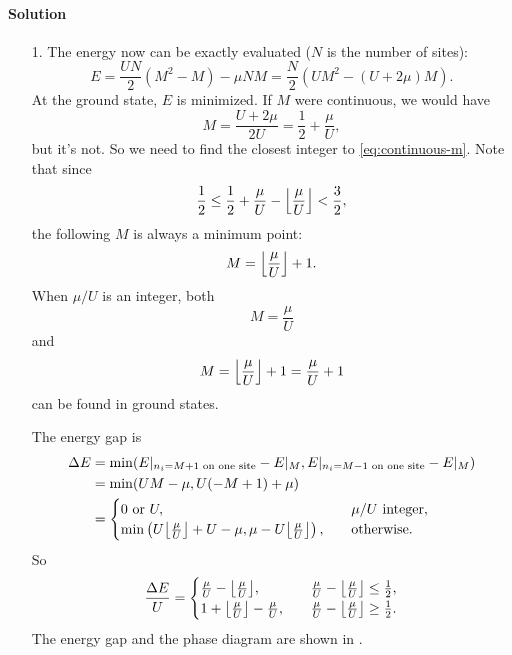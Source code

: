 \documentclass[hyperref, a4paper]{article}
\DeclarePairedDelimiter\floor{\lfloor}{\rfloor}
\begin{document}
\paragraph{Solution} \begin{itemize}
\item[1.] The energy now can be exactly evaluated ($N$ is the number of sites):
\begin{equation}
    E = \frac{U N}{2} (M^2 - M) - \mu NM
    = \frac{N}{2} (U M^2 - (U + 2\mu) M).
\end{equation}
At the ground state, $E$ is minimized.
If $M$ were continuous, we would have
\begin{equation}
    M = \frac{U + 2\mu}{2 U} = \frac{1}{2} + \frac{\mu}{U}, 
    \label{eq:continuous-m}
\end{equation}
but it's not. So we need to find the closest integer to \eqref{eq:continuous-m}.
Note that since
\[
    \frac{1}{2} \leq \frac{1}{2} + \frac{\mu}{U} - \floor*{\frac{\mu}{U}} < \frac{3}{2},
\]
the following $M$ is always a minimum point:
\begin{equation}
    M = \floor*{\frac{\mu}{U}} + 1.
\end{equation}
When $\mu / U$ is an integer, both 
\begin{equation}
    M = \frac{\mu}{U} 
\end{equation}
and 
\begin{equation}
    M = \floor*{\frac{\mu}{U}} + 1 = \frac{\mu}{U} + 1
\end{equation}
can be found in ground states.

The energy gap is 
\begin{equation}
    \begin{aligned}
        \Delta E &= \min( E|_{n_i = M+1 \text{ on one site}} - E|_M, E|_{n_i = M-1 \text{ on one site}} - E|_M ) \\
        &= \min( UM - \mu, U(- M + 1) + \mu ) \\
        &= \begin{cases}
            0 \text{ or } U, \quad &\text{$\mu / U$ integer}, \\
            \min\left( 
                U \floor*{\frac{\mu}{U}} + U - \mu,
                \mu - U \floor*{\frac{\mu}{U}} \right),\quad &\text{otherwise}.
        \end{cases}
    \end{aligned}
\end{equation}
So
\begin{equation}
    \frac{\Delta E}{U} 
    = \begin{cases}
        \frac{\mu}{U} - \floor*{\frac{\mu}{U}} , &\quad \frac{\mu}{U} - \floor*{\frac{\mu}{U}} \leq \frac{1}{2} , \\
        1 + \floor*{\frac{\mu}{U}} - \frac{\mu}{U} , &\quad \frac{\mu}{U} - \floor*{\frac{\mu}{U}} \geq \frac{1}{2}. 
    \end{cases}
\end{equation}
The energy gap and the phase diagram are shown in .


\end{itemize}
\end{document}
